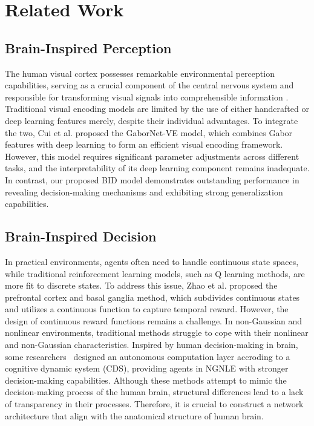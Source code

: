 \section{Related Work}

\subsection{Brain-Inspired Perception}
\hspace{1pc}The human visual cortex possesses remarkable environmental perception capabilities, serving as a crucial component of the central nervous system and responsible for transforming visual signals into comprehensible information \cite{9134376}. 
Traditional visual encoding models are limited by the use of either handcrafted or deep learning features merely, despite their individual advantages\cite{kubilius2019brain}. 
To integrate the two, Cui et al. \cite{8574054} proposed the GaborNet-VE model, which combines Gabor features with deep learning to form an efficient visual encoding framework. 
However, this model requires significant parameter adjustments across different tasks, and the interpretability of its deep learning component remains inadequate\cite{liao2021statistical}. 
In contrast, our proposed BID model demonstrates outstanding performance in revealing decision-making mechanisms and exhibiting strong generalization capabilities.

\subsection{Brain-Inspired Decision}
\hspace{1pc}In practical environments, agents often need to handle continuous state spaces, while traditional reinforcement learning models, such as Q learning methods, are more fit to discrete states\cite{xi2020automatic}. 
To address this issue, Zhao et al. \cite{zhao2018brain} proposed the prefrontal cortex and basal ganglia method, which subdivides continuous states and utilizes a continuous function to capture temporal reward. 
However, the design of continuous reward functions remains a challenge. 
In non-Gaussian and nonlinear environments, traditional methods struggle to cope with their nonlinear and non-Gaussian characteristics\cite{naghshvarianjahromi2020natural}. 
Inspired by human decision-making in brain, some researchers~\cite{dai2013dynamic} designed an autonomous computation layer accroding to a cognitive dynamic system (CDS), providing agents in NGNLE with stronger decision-making capabilities. 
Although these methods attempt to mimic the decision-making process of the human brain, structural differences lead to a lack of transparency in their processes. 
Therefore, it is crucial to construct a network architecture that align with the anatomical structure of human brain.


